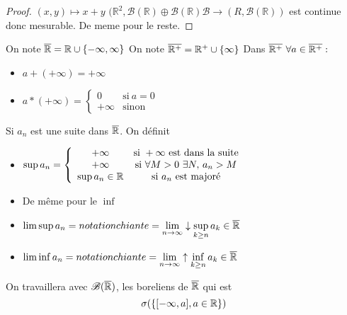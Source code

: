\begin{proof}
	$(x,y) \mapsto x + y$
	$(\mathbb{R}^2, \mathscr{B}(\mathbb{R}) \oplus \mathscr{B}(\mathbb{R})  \mathscr{B} \rightarrow (R,   \mathscr{B}(\mathbb{R})) $
	est continue donc mesurable. De meme pour le reste.
\end{proof}


\begin{definition}
	On note $\overline{\mathbb{R}} = \mathbb{R} \cup \{ -\infty, \infty \}$
	On note $\overline{\mathbb{R^+}} = \mathbb{R}^+ \cup \{  \infty \}$
	Dans $\overline{\mathbb{R^+}}\ \forall a \in \overline{\mathbb{R^+}}: $
	\begin{itemize}
		\item $a + (+\infty) = +\infty$
		\item
		      $a * (+\infty) = \left\{ \begin{array}{cc}
                      0       & \text{si} \  a = 0 \\
                      +\infty & \text{sinon}
			      \end{array}\right.$
	\end{itemize}
\end{definition}

\begin{definition}
	Si $a_n$ est une suite dans $\overline{\mathbb{R}}$. On définit
	\begin{itemize}
		\item $\sup a_n =
			      \left\{ \begin{array}{cc}
				      +\infty         & \text{si} \ +\infty \ \text{est dans la suite}   \\
				      +\infty         & \text{si} \ \forall M > 0 \ \exists N,\, a_n > M \\
				      \sup a_n \in \R & \text{si} \ a_n\  \text{est majoré}
			      \end{array}\right.$

		\item De même pour le $\inf$
		\item $\limsup a_n = notation chiante = \lim\limits_{n \rightarrow \infty}\downarrow \sup\limits_{k \geq n } a_k \in \overline{\mathbb{R}}$
		\item $\liminf a_n = notation chiante = \lim\limits_{n \to \infty}\uparrow \inf\limits_{k \geq n } a_k \in \overline{\mathbb{R}}$
	\end{itemize}
\end{definition}


\begin{remarque}
	On travaillera avec $\mathscr{B}(\overline{\mathbb{R}})$, les boreliens de $\overline{\mathbb{R}}$ qui est
	$$\sigma (\left\{[-\infty, a], a \in \mathbb{R}\right\})$$
\end{remarque}


